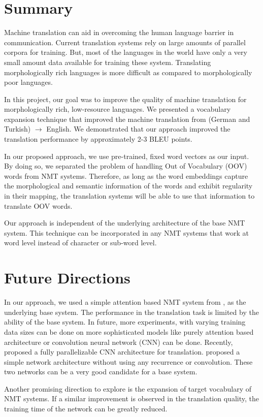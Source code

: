 

\section{Summary}
Machine translation can aid in overcoming the human language barrier in communication. Current translation systems rely on large amounts of parallel corpora for training. But, most of the languages in the world have only a very small amount data available for training these system. Translating morphologically rich languages is more difficult as compared to morphologically poor languages. 


In this project, our goal was to improve the quality of machine translation for morphologically rich, low-resource languages. We presented a vocabulary expansion technique that improved the machine translation from (German and Turkish) $\rightarrow$ English. We demonstrated that our approach improved the translation performance by approximately 2-3 BLEU points.

In our proposed approach, we use pre-trained, fixed word vectors as our input. By doing so, we separated the problem of handling Out of Vocabulary (OOV) words from NMT systems. Therefore, as long as the word embeddings capture the morphological and semantic information of the words and exhibit regularity in their mapping, the translation systems will be able to use that information to translate OOV words. 

Our approach is independent of the underlying architecture of the base NMT system. This technique can be incorporated in any NMT systems that work at word level instead of character or sub-word level.

\section{Future Directions}

In our approach, we used a simple attention based NMT system from \cite{luong2015effective}, as the underlying base system. The performance in the translation task is limited by the ability of the base system. In future, more experiments, with varying training data sizes can be done on more sophisticated models like purely attention based architecture or convolution neural network (CNN) can be done. Recently, \cite{gehring2017convolutional} proposed a fully parallelizable CNN architecture for translation. \cite{vaswani2017attention} proposed a simple network architecture without using any recurrence or convolution. These two networks can be a very good candidate for a base system.


Another promising direction to explore is the expansion of target vocabulary of NMT systems. If a similar improvement is observed in the translation quality, the training time of the network can be greatly reduced.
